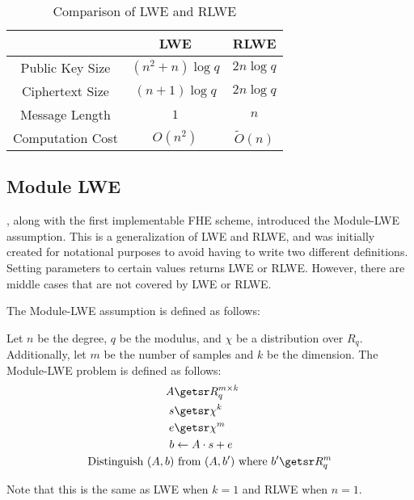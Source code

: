 \begin{table}[!htbp]
    \centering
    \begin{tabular}{|c|c|c|}
        \hline
        & LWE & RLWE \\
        \hline
        Public Key Size & $(n^2 + n) \log q$ & $2n \log q$ \\
        \hline
        Ciphertext Size & $(n+1) \log q$ & $2n \log q$ \\
        \hline
        Message Length & $1$ & $n$ \\
        \hline
        Computation Cost & $O(n^2)$ & $\tilde{O}(n)$ \\
        \hline
    \end{tabular}
    \caption{Comparison of LWE and RLWE}
\end{table}

\subsection{Module LWE}
\cite{ITCS:BraGenVai12}, along with the first implementable FHE scheme, introduced the Module-LWE assumption. This is a generalization of LWE and RLWE, and was initially created for notational purposes to avoid having to write two different definitions. Setting parameters to certain values returns LWE or RLWE. However, there are middle cases that are not covered by LWE or RLWE. 

The Module-LWE assumption is defined as follows:
\begin{definition}
    Let $n$ be the degree, $q$ be the modulus, and $\chi$ be a distribution over $R_q$. Additionally, let $m$ be the number of samples and $k$ be the dimension.
    The Module-LWE problem is defined as follows: 
    \begin{align*}
        A &\getsr R_q^{m \times k} \\
        s &\getsr \chi^k \\
        e &\getsr \chi^m \\
        b &\gets A \cdot s + e \\
        \text{Distinguish } (A,b) &\text{ from } (A,b') \text{ where } b' \getsr R_q^m
    \end{align*}
\end{definition}

Note that this is the same as LWE when $k = 1$ and RLWE when $n = 1$. 

